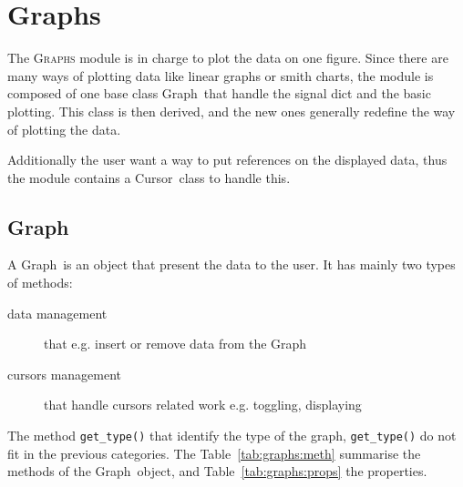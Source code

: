 \documentclass[a4paper,11pt]{article}
\newcommand{\meth}[1]{\texttt{#1()}}
\newcommand{\cls}[1]{\textsf{#1}}
\newcommand{\module}[1]{\textsc{#1}}
\newcommand{\graph}{\cls{Graph}}
\newcommand{\cursor}{\cls{Cursor}}
\begin{document}
\section{Graphs}
\label{sec:graphs}
The \module{Graphs} module is in charge to plot the data on one figure.
Since there are many ways of plotting data like linear graphs or smith charts, the module is composed of one base class \graph\ that handle the signal dict and the basic plotting.
This class is then derived, and the new ones generally redefine the way of plotting the data.

Additionally the user want a way to put references on the displayed data, thus the module contains a \cursor\ class to handle this.

\subsection{Graph}
\label{sec:graphs:graph}
A \graph\ is an object that present the data to the user.
It has mainly two types of methods:
\begin{description}
\item[data management] that e.g. insert or remove data from the \graph
\item[cursors management] that handle cursors related work e.g. toggling, displaying
\end{description}
The method \meth{get\_type} that identify the type of the graph, \meth{get\_type} do not fit in the previous categories.
The Table~\ref{tab:graphs:meth} summarise the methods of the \graph\ object, and Table~\ref{tab:graphs:props} the properties.
\end{document}
